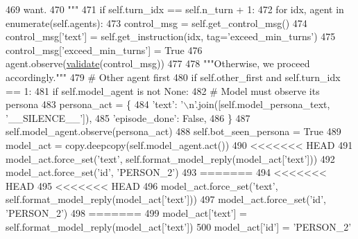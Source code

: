 \begin{DoxyCode}
469 \textcolor{stringliteral}{        want.}
470 \textcolor{stringliteral}{        """}
471         \textcolor{keywordflow}{if} self.turn\_idx == self.n\_turn + 1:
472             \textcolor{keywordflow}{for} idx, agent \textcolor{keywordflow}{in} enumerate(self.agents):
473                 control\_msg = self.get\_control\_msg()
474                 control\_msg[\textcolor{stringliteral}{'text'}] = self.get\_instruction(idx, tag=\textcolor{stringliteral}{'exceed\_min\_turns'})
475                 control\_msg[\textcolor{stringliteral}{'exceed\_min\_turns'}] = \textcolor{keyword}{True}
476                 agent.observe(\hyperlink{namespaceparlai_1_1core_1_1worlds_afc3fad603b7bce41dbdc9cdc04a9c794}{validate}(control\_msg))
477 
478         \textcolor{stringliteral}{"""Otherwise, we proceed accordingly."""}
479         \textcolor{comment}{# Other agent first}
480         \textcolor{keywordflow}{if} self.other\_first \textcolor{keywordflow}{and} self.turn\_idx == 1:
481             \textcolor{keywordflow}{if} self.model\_agent \textcolor{keywordflow}{is} \textcolor{keywordflow}{not} \textcolor{keywordtype}{None}:
482                 \textcolor{comment}{# Model must observe its persona}
483                 persona\_act = \{
484                     \textcolor{stringliteral}{'text'}: \textcolor{stringliteral}{'\(\backslash\)n'}.join([self.model\_persona\_text, \textcolor{stringliteral}{'\_\_SILENCE\_\_'}]),
485                     \textcolor{stringliteral}{'episode\_done'}: \textcolor{keyword}{False},
486                 \}
487                 self.model\_agent.observe(persona\_act)
488                 self.bot\_seen\_persona = \textcolor{keyword}{True}
489                 model\_act = copy.deepcopy(self.model\_agent.act())
490 <<<<<<< HEAD
491                 model\_act.force\_set(\textcolor{stringliteral}{'text'}, self.format\_model\_reply(model\_act[\textcolor{stringliteral}{'text'}]))
492                 model\_act.force\_set(\textcolor{stringliteral}{'id'}, \textcolor{stringliteral}{'PERSON\_2'})
493 =======
494 <<<<<<< HEAD
495 <<<<<<< HEAD
496                 model\_act.force\_set(\textcolor{stringliteral}{'text'}, self.format\_model\_reply(model\_act[\textcolor{stringliteral}{'text'}]))
497                 model\_act.force\_set(\textcolor{stringliteral}{'id'}, \textcolor{stringliteral}{'PERSON\_2'})
498 =======
499                 model\_act[\textcolor{stringliteral}{'text'}] = self.format\_model\_reply(model\_act[\textcolor{stringliteral}{'text'}])
500                 model\_act[\textcolor{stringliteral}{'id'}] = \textcolor{stringliteral}{'PERSON\_2'}

\end{DoxyCode}
